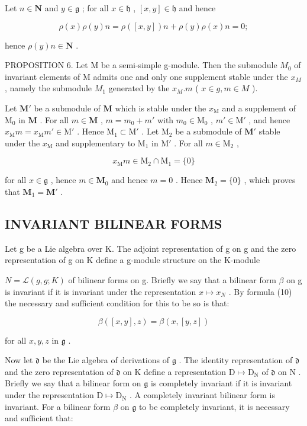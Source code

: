 Let \(n\in \mathbf{N}\) and \(y\in \mathfrak{g}\) ; for all \(x\in \mathfrak{h}\) , \([x,y]\in \mathfrak{h}\) and hence

\[
\rho (x) \rho (y) n = \rho ([ x, y ]) n + \rho (y) \rho (x) n = 0;
\]

hence \(\rho(y)n\in\mathbf{N}\) .

PROPOSITION 6. Let M be a semi-simple g-module. Then the submodule \(M_{0}\) of invariant elements of M admits one and only one supplement stable under the \(x_{M}\) , namely the submodule \(M_{1}\) generated by the \(x_{M}.m\) ( \(x \in g, m \in M\) ).

Let \(\mathbf{M}'\) be a submodule of \(\mathbf{M}\) which is stable under the \(x_{\mathrm{M}}\) and a supplement of \(\mathrm{M}_0\) in \(\mathbf{M}\) . For all \(m \in \mathbf{M}\) , \(m = m_0 + m'\) with \(m_0 \in \mathrm{M}_0\) , \(m' \in \mathrm{M}'\) , and hence \(x_{\mathrm{M}}m = x_{\mathrm{M}}m' \in \mathrm{M}'\) . Hence \(\mathrm{M}_1 \subset \mathrm{M}'\) . Let \(\mathrm{M}_2\) be a submodule of \(\mathbf{M}'\) stable under the \(x_{\mathrm{M}}\) and supplementary to \(\mathrm{M}_1\) in \(\mathrm{M}'\) . For all \(m \in \mathrm{M}_2\) ,

\[
x _ {\mathrm{M}} m \in \mathrm{M} _ {2} \cap \mathrm{M} _ {1} = \{0 \}
\]

for all \(x \in \mathfrak{g}\) , hence \(m \in \mathbf{M}_0\) and hence \(m = 0\) . Hence \(\mathbf{M}_2 = \{0\}\) , which proves that \(\mathbf{M}_1 = \mathbf{M}'\) .

\subsection{INVARIANT BILINEAR FORMS}

Let g be a Lie algebra over K. The adjoint representation of g on g and the zero representation of g on K define a g-module structure on the K-module

\(N = \mathcal{L}(g, g; K)\) of bilinear forms on g. Briefly we say that a bilinear form \(\beta\) on g is invariant if it is invariant under the representation \(x \mapsto x_{N}\) . By formula (10) the necessary and sufficient condition for this to be so is that:

\[
\beta ([ x, y ], z) = \beta (x, [ y, z ])\tag{13}
\]

for all \(x, y, z\) in \(\mathfrak{g}\) .

Now let \(\mathfrak{d}\) be the Lie algebra of derivations of \(\mathfrak{g}\) . The identity representation of \(\mathfrak{d}\) and the zero representation of \(\mathfrak{d}\) on \(\mathrm{K}\) define a representation \(\mathrm{D} \mapsto \mathrm{D}_{\mathrm{N}}\) of \(\mathfrak{d}\) on \(\mathrm{N}\) . Briefly we say that a bilinear form on \(\mathfrak{g}\) is completely invariant if it is invariant under the representation \(\mathrm{D} \mapsto \mathrm{D}_{\mathrm{N}}\) . A completely invariant bilinear form is invariant. For a bilinear form \(\beta\) on \(\mathfrak{g}\) to be completely invariant, it is necessary and sufficient that:

